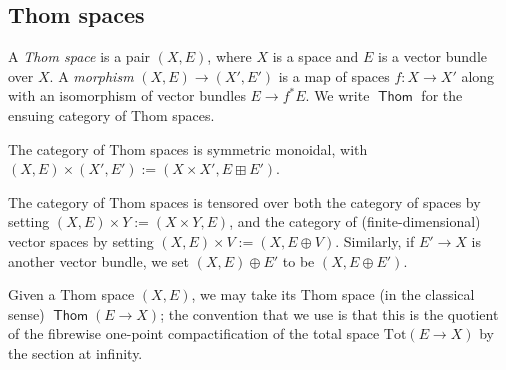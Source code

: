 \documentclass{TPmod}
\newcommand{\Tot}{\mathrm{Tot}}
\DeclareMathOperator{\Thom}{\mathsf{Thom}}
\numberwithin{equation}{section}
\begin{document}
\subsection{Thom spaces}
    \begin{defn}
        A \emph{Thom space} is a pair $(X, E)$, where $X$ is a space and $E$ is a vector bundle over $X$. A \emph{morphism} $(X, E) \to (X', E')$ is a map of spaces $f: X \to X'$ along with an isomorphism of vector bundles $E \to f^*E$. We write $\Thom$ for the ensuing category of Thom spaces.

        The category of Thom spaces is symmetric monoidal, with $(X, E) \times (X', E') := (X \times X', E \boxplus E')$.

        The category of Thom spaces is tensored over both the category of spaces by setting $(X, E) \times Y := (X \times Y, E)$, and the category of (finite-dimensional) vector spaces by setting $(X, E) \times V := (X, E \oplus V)$. Similarly, if $E' \to X$ is another vector bundle, we set $(X, E) \oplus E'$ to be $(X, E \oplus E')$.
    \end{defn}

    Given a Thom space $(X, E)$, we may take its Thom space (in the classical sense) $\Thom(E \to X)$; the convention that we use is that this is the quotient of the fibrewise one-point compactification of the total space $\Tot(E \to X)$ by the section at infinity.
\end{document}

